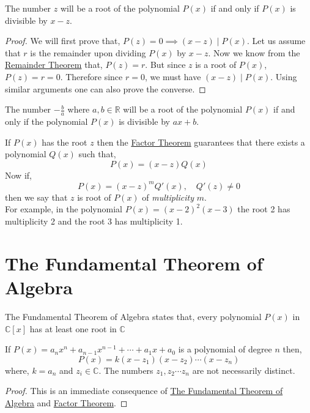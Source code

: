 \begin{theorem}\label{thm:factor-theorem}
    The number $z$ will be a root of the polynomial $P(x)$ if and only if $P(x)$ is divisible by $x-z$.
\end{theorem}
\begin{proof}
    We will first prove that, $P(z)=0 \implies (x-z) \mid P(x)$. 
    Let us assume that $r$ is the remainder upon dividing $P(x)$ by $x-z$. 
    Now we know from the \hyperref[thm:remainder-theorem]{Remainder Theorem} that, $P(z)=r$. 
    But since $z$ is a root of $P(x)$, $P(z)=r=0$. Therefore since $r=0$, we must have $(x-z)\mid P(x)$. 
    Using similar arguments one can also prove the converse. 
\end{proof}
\begin{corollary}
    The number $-\frac{b}{a}$ where $a, b\in \mathbb{R}$ will be a root of the polynomial $P(x)$ if and only if the 
    polynomial $P(x)$ is divisible by $ax+b$.
\end{corollary}

If $P(x)$ has the root $z$ then the \hyperref[thm:factor-theorem]{Factor Theorem} guarantees that there exists a polynomial 
$Q(x)$ such that,
\[
    P(x) = \left(x - z\right)Q(x)
\]
Now if,
\[
    P(x) = \left(x-z\right)^{m}Q'(x), \quad Q'(z) \neq 0
\]
then we say that $z$ is root of $P(x)$ of \textit{multiplicity} $m$. \\
For example, in the polynomial $P(x)=\left(x-2\right)^{2}\left(x-3\right)$ 
the root 2 has multiplicity 2 and the root 3 has multiplicity 1.

\section{The Fundamental Theorem of Algebra}

\begin{theorem}\label{thm:fta}
    The Fundamental Theorem of Algebra states that, every polynomial $P(x)$ in $\mathbb{C}[x]$ has at least 
    one root in $\mathbb{C}$
\end{theorem}
\begin{corollary}
    If $P(x) = a_{n}x^{n} + a_{n-1}x^{n-1} + \cdots + a_{1}x + a_{0}$ is a polynomial of degree $n$ then,
    \[
        P(x) = k(x - z_{1})(x - z_{2})\cdots (x - z_{n})
    \]
    where, $k = a_{n}$ and $z_{i} \in \mathbb{C}$. The numbers $z_{1},z_{2}\cdots z_{n}$ are not necessarily 
    distinct.
\end{corollary}
\begin{proof}
    This is an immediate consequence of \hyperref[thm:fta]{The Fundamental Theorem of Algebra} 
    and \hyperref[thm:factor-theorem]{Factor Theorem}.
\end{proof}

